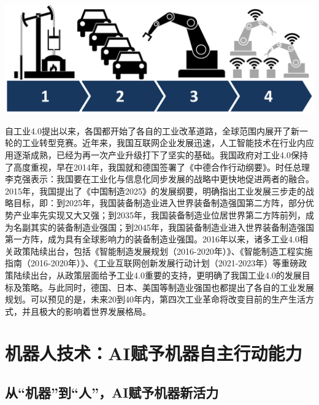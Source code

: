 \begin{marginfigure}
\includegraphics{images/industry_2.jpg}
\end{marginfigure}

自工业4.0提出以来，各国都开始了各自的工业改革道路，全球范围内展开了新一轮的工业转型竞赛。近年来，我国互联网企业发展迅速，人工智能技术在行业内应用逐渐成熟，已经为再一次产业升级打下了坚实的基础。我国政府对工业4.0保持了高度重视，早在2014年，我国就和德国签署了《中德合作行动纲要》。时任总理李克强表示：我国要在工业化与信息化同步发展的战略中更快地促进两者的融合。2015年，我国提出了《中国制造2025》的发展纲要，明确指出工业发展三步走的战略目标，即：到2025年，我国装备制造业进入世界装备制造强国第二方阵，部分优势产业率先实现又大又强；到2035年，我国装备制造业位居世界第二方阵前列，成为名副其实的装备制造业强国；到2045年，我国装备制造业进入世界装备制造强国第一方阵，成为具有全球影响力的装备制造业强国。2016年以来，诸多工业4.0相关政策陆续出台，包括《智能制造发展规划（2016-2020年）》、《智能制造工程实施指南（2016-2020年）》、《工业互联网创新发展行动计划（2021-2023年）等重磅政策陆续出台，从政策层面给予工业4.0重要的支持，更明确了我国工业4.0的发展目标及策略。与此同时，德国、日本、美国等制造业强国也都提出了各自的工业发展规划。可以预见的是，未来20到40年内，第四次工业革命将改变目前的生产生活方式，并且极大的影响着世界发展格局。

\section[机器人技术]{机器人技术：AI赋予机器自主行动能力}
\subsection{从“机器”到“人”，AI赋予机器新活力}

